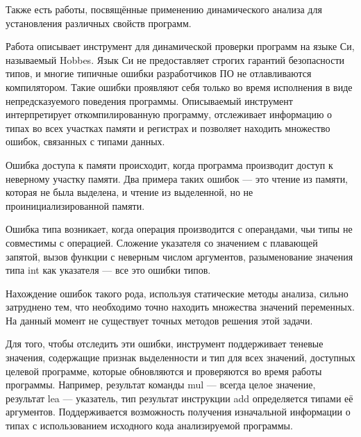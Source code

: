\documentclass[a4paper,12pt,russian]{article}
\newcommand{\code}[1]{\textsf{#1}}
\begin{document}
Также есть работы, посвящённые применению динамического анализа для установления различных свойств программ.

Работа \cite{typechecking} описывает инструмент для динамической проверки программ на языке Си, называемый \code{Hobbes}.
Язык Си не предоставляет строгих гарантий безопасности типов, и многие типичные ошибки разработчиков ПО не отлавливаются компилятором. Такие ошибки проявляют себя только во время исполнения в виде непредсказуемого поведения программы.
Описываемый инструмент интерпретирует откомпилированную программу, отслеживает информацию о типах во всех участках памяти и регистрах и позволяет находить множество ошибок, связанных с типами данных.

Ошибка доступа к памяти происходит, когда программа производит доступ к неверному участку памяти.
Два примера таких ошибок --- это чтение из памяти, которая не была выделена, и чтение из выделенной, но не проинициализированной памяти.

Ошибка типа возникает, когда операция производится с операндами, чьи типы не совместимы с операцией.
Сложение указателя со значением с плавающей запятой, вызов функции с неверным числом аргументов, разыменование значения типа \code{int} как указателя --- все это ошибки типов.

Нахождение ошибок такого рода, используя статические методы анализа, сильно затруднено тем, что необходимо точно находить множества значений переменных.
На данный момент не существует точных методов решения этой задачи.

Для того, чтобы отследить эти ошибки, инструмент поддерживает теневые значения, содержащие признак выделенности и тип для всех значений, доступных целевой программе, которые обновляются и проверяются во время работы программы.
Например, результат команды \code{mul} --- всегда целое значение, результат \code{lea} --- указатель, тип результат инструкции \code{add} определяется типами её аргументов.
Поддерживается возможность получения изначальной информации о типах с использованием исходного кода анализируемой программы.
\end{document}
